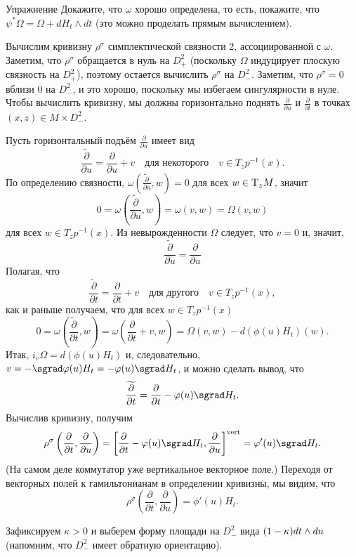 \begin{ex*}{Упражнение}
  Докажите, что $\omega$ хорошо определена, то есть, покажите, что
  $\psi^\ast \Omega = \Omega + dH_t \wedge dt$ (это можно проделать
  прямым вычислением).
\end{ex*}

Вычислим кривизну $\rho^\sigma$ симплектической связности 2,
ассоциированной с $\omega$. 
Заметим, что $\rho^\sigma$ обращается в нуль на $D_+^2$ (поскольку
$\Omega$ индуцирует плоскую связность на $D_+^2$), поэтому остается
вычислить $\rho^\sigma$ на $D_-^2$. 
Заметим, что $\rho^\sigma = 0$ вблизи $0$ на $D_-^2$, и это хорошо, поскольку мы избегаем сингулярности в нуле.
Чтобы вычислить кривизну, мы должны горизонтально поднять $\tfrac{\partial}{\partial u}$ и $\tfrac{\partial}{\partial t}$ в точках $(x, z) \in M \times D_-^2$.

Пусть горизонтальный подъём $\tfrac{\partial}{\partial u}$ имеет вид 
\[\widetilde{\frac{\partial}{\partial u}}  =\frac{\partial}{\partial u} + v
\quad\text{для некоторого}\quad
v \in T_z p^{-1} (x).\]
По определению связности, $\omega(\widetilde{\frac{\partial}{\partial u}},w)=0$ для всех $w\in \mathrm{T}_zM$, значит 
\[0=\omega\left(\widetilde{\frac{\partial}{\partial u}}, w\right) = \omega(v, w) = \Omega(v, w)\]
для всех $w \in T_z p^{-1} (x)$.
Из невырожденности $\Omega$ следует, что $v = 0$ и, значит, 
\[\widetilde{\frac{\partial}{\partial u}}=\frac{\partial}{\partial u}\]
Полагая, что
\[\widetilde{\frac{\partial}{\partial t}}=\frac{\partial}{\partial t}+v
\quad\text{для другого}\quad
v \in T_z p^{-1} (x),\]
как и раньше получаем, что для всех $w \in T_z p^{-1} (x)$
\[0=\omega\left(\widetilde{\frac{\partial}{\partial t}}, w\right) = \omega(\frac{\partial}{\partial t}+v, w) = \Omega(v, w)- d(\phi(u)H_t)(w).
\]
Итак, 
$i_v \Omega = d(\phi(u)H_t)$ и, следовательно, 
$v = - \sgrad \phi(u)H_t = -\phi(u) \sgrad H_t$,
и можно сделать вывод, что 
\[\widetilde{\frac{\partial}{\partial t}}=\frac{\partial}{\partial t}-\phi(u) \sgrad H_t.\]
Вычислив кривизну, получим 
\[\rho^\sigma
\left(\frac{\partial}{\partial t},\frac{\partial}{\partial u}\right)
=
\left[\frac{\partial}{\partial t}-\phi(u)\sgrad H_t,\frac{\partial}{\partial u}\right]^\vert
=
\phi'(u)\sgrad H_t.\]
(На самом деле коммутатор уже вертикальное векторное поле.)
Переходя от векторных полей к гамильтонианам в определении кривизны, мы видим, что
\[\rho^\sigma\left(\frac{\partial}{\partial t},\frac{\partial}{\partial u}\right)
=\phi'(u) H_t.
\]

Зафиксируем $\kappa > 0$ и выберем форму площади на $D_-^2$ вида $(1
\z- \kappa)dt \wedge du$ (напомним, что $D_-^2$ имеет обратную
ориентацию).

